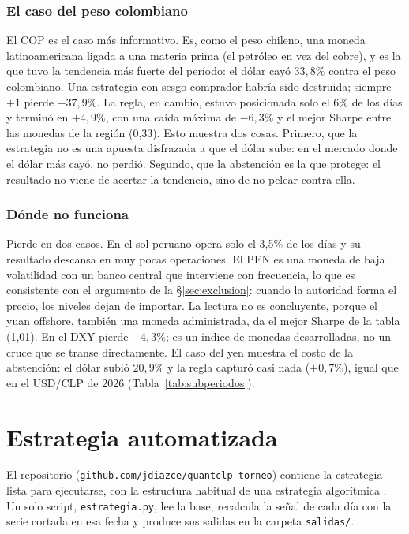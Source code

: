 \documentclass[10pt,a4paper]{article}
\begin{document}
\subsubsection{El caso del peso colombiano}

El COP es el caso más informativo. Es, como el peso chileno, una moneda latinoamericana
ligada a una materia prima (el petróleo en vez del cobre), y es la que tuvo la tendencia
más fuerte del período: el dólar cayó $33{,}8\%$ contra el peso colombiano. Una
estrategia con sesgo comprador habría sido destruida; siempre~$+1$ pierde $-37{,}9\%$.
La regla, en cambio, estuvo posicionada solo el 6\% de los días y terminó en $+4{,}9\%$,
con una caída máxima de $-6{,}3\%$ y el mejor Sharpe entre las monedas de la región
(0,33). Esto muestra dos cosas. Primero, que la estrategia no es una apuesta disfrazada a
que el dólar sube: en el mercado donde el dólar más cayó, no perdió. Segundo, que la
abstención es la que protege: el resultado no viene de acertar la tendencia, sino de no
pelear contra ella.

\subsubsection{Dónde no funciona}

Pierde en dos casos. En el sol peruano opera solo el 3,5\% de los días y su resultado
descansa en muy pocas operaciones. El PEN es una moneda de baja volatilidad con un banco
central que interviene con frecuencia, lo que es consistente con el argumento de la
§\ref{sec:exclusion}: cuando la autoridad forma el precio, los niveles dejan de
importar. La lectura no es concluyente, porque el yuan offshore, también una moneda
administrada, da el mejor Sharpe de la tabla (1,01). En el DXY pierde $-4{,}3\%$; es un
índice de monedas desarrolladas, no un cruce que se transe directamente. El caso del yen
muestra el costo de la abstención: el dólar subió $20{,}9\%$ y la regla capturó casi nada
($+0{,}7\%$), igual que en el USD/CLP de 2026 (Tabla~\ref{tab:subperiodos}).

\section{Estrategia automatizada}\label{sec:auto}

El repositorio
(\href{https://github.com/jdiazce/quantclp-torneo}{\texttt{github.com/jdiazce/quantclp-torneo}})
contiene la estrategia lista para ejecutarse, con la estructura habitual de una
estrategia algorítmica \citep{hilpisch2020}. Un solo script, \texttt{estrategia.py}, lee
la base, recalcula la señal de cada día con la serie cortada en esa fecha y produce sus
salidas en la carpeta \texttt{salidas/}.
\end{document}
